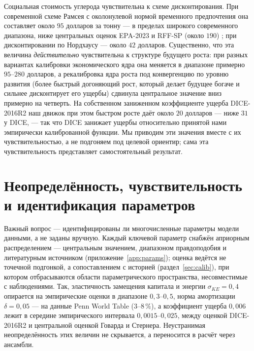 \documentclass[11pt,a4paper]{article}
\begin{document}
Социальная стоимость углерода чувствительна к схеме дисконтирования. При современной
схеме Рамсея с околонулевой нормой временного предпочтения она составляет около
$95$ долларов за тонну --- в пределах широкого современного диапазона, ниже
центральных оценок EPA-2023 и RFF-SP (около $190$) \citep{rennert2022,epa2023}; при
дисконтировании по Нордхаусу --- около $42$ долларов. Существенно, что эта величина
\emph{действительно} чувствительна к структуре будущего роста: при разных вариантах
калибровки экономического ядра она меняется в диапазоне примерно $95$--$280$ долларов, а
рекалибровка ядра роста под конвергенцию по уровню развития (более быстрый догоняющий рост, который
делает будущее богаче и сильнее дисконтирует его ущербы) сдвинула центральное значение вниз примерно
на четверть. На собственном заниженном коэффициенте ущерба DICE-2016R2 наш движок при этом быстром
росте даёт около $20$ долларов --- ниже $31$ у DICE, --- так что DICE занижает ущербы относительно
принятой нами эмпирически калиброванной функции. Мы приводим эти значения вместе с их чувствительностью, а не подгоняем под
целевой ориентир; сама эта чувствительность представляет самостоятельный результат.

\section{Неопределённость, чувствительность и иденти\-фикация параметров}
\label{sec:uq}

Важный вопрос --- идентифицированы ли многочисленные параметры модели данными, а не заданы
вручную. Каждый ключевой параметр снабжён априорным распределением ---
центральным значением, диапазоном правдоподобия и литературным источником
(приложение~\ref{app:params}); оценка ведётся не точечной подгонкой, а сопоставлением с
историей (раздел~\ref{sec:calib}), при котором отбрасываются области параметрического
пространства, несовместимые с наблюдениями. Так, эластичность замещения капитала и энергии
$\sigma_{KE}=0{,}4$ опирается на эмпирические оценки в диапазоне $0{,}3$--$0{,}5$, норма
амортизации $\delta=0{,}05$ --- на данные Penn World Table ($3$--$8\,\%$), а коэффициент
ущерба $0{,}006$ лежит в середине эмпирического интервала $0{,}0015$--$0{,}025$, между оценкой
DICE-2016R2 и центральной оценкой Говарда и Стернера. Неустранимая неопределённость этих
величин не скрывается, а переносится в расчёт через ансамбли.
\end{document}
